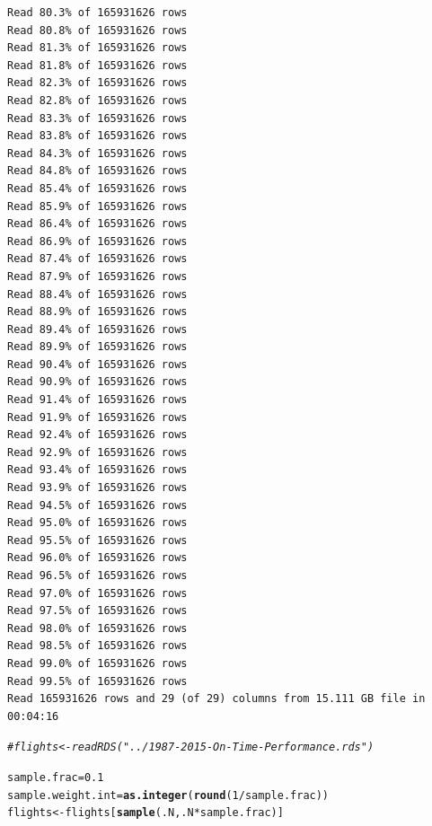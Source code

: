 \documentclass{scrreprt}\usepackage[]{graphicx}\usepackage[]{color}
\makeatletter
\newcommand{\hlnum}[1]{\textcolor[rgb]{0.686,0.059,0.569}{#1}}%
\newcommand{\hlcom}[1]{\textcolor[rgb]{0.678,0.584,0.686}{\textit{#1}}}%
\newcommand{\hlopt}[1]{\textcolor[rgb]{0,0,0}{#1}}%
\newcommand{\hlstd}[1]{\textcolor[rgb]{0.345,0.345,0.345}{#1}}%
\newcommand{\hlkwb}[1]{\textcolor[rgb]{0.69,0.353,0.396}{#1}}%
\newcommand{\hlkwd}[1]{\textcolor[rgb]{0.737,0.353,0.396}{\textbf{#1}}}%
\newenvironment{kframe}{%
 \def\at@end@of@kframe{}%
 \ifinner\ifhmode%
  \def\at@end@of@kframe{\end{minipage}}%
  \begin{minipage}{\columnwidth}%
 \fi\fi%
 \def\FrameCommand##1{\hskip\@totalleftmargin \hskip-\fboxsep
 \colorbox{shadecolor}{##1}\hskip-\fboxsep
     \hskip-\linewidth \hskip-\@totalleftmargin \hskip\columnwidth}%
 \MakeFramed {\advance\hsize-\width
   \@totalleftmargin\z@ \linewidth\hsize
   \@setminipage}}%
 {\par\unskip\endMakeFramed%
 \at@end@of@kframe}
\newenvironment{knitrout}{}{} %
\makeatother
\begin{document}
\begin{knitrout}
\begin{kframe}
\begin{verbatim}
Read 80.3% of 165931626 rows
Read 80.8% of 165931626 rows
Read 81.3% of 165931626 rows
Read 81.8% of 165931626 rows
Read 82.3% of 165931626 rows
Read 82.8% of 165931626 rows
Read 83.3% of 165931626 rows
Read 83.8% of 165931626 rows
Read 84.3% of 165931626 rows
Read 84.8% of 165931626 rows
Read 85.4% of 165931626 rows
Read 85.9% of 165931626 rows
Read 86.4% of 165931626 rows
Read 86.9% of 165931626 rows
Read 87.4% of 165931626 rows
Read 87.9% of 165931626 rows
Read 88.4% of 165931626 rows
Read 88.9% of 165931626 rows
Read 89.4% of 165931626 rows
Read 89.9% of 165931626 rows
Read 90.4% of 165931626 rows
Read 90.9% of 165931626 rows
Read 91.4% of 165931626 rows
Read 91.9% of 165931626 rows
Read 92.4% of 165931626 rows
Read 92.9% of 165931626 rows
Read 93.4% of 165931626 rows
Read 93.9% of 165931626 rows
Read 94.5% of 165931626 rows
Read 95.0% of 165931626 rows
Read 95.5% of 165931626 rows
Read 96.0% of 165931626 rows
Read 96.5% of 165931626 rows
Read 97.0% of 165931626 rows
Read 97.5% of 165931626 rows
Read 98.0% of 165931626 rows
Read 98.5% of 165931626 rows
Read 99.0% of 165931626 rows
Read 99.5% of 165931626 rows
Read 165931626 rows and 29 (of 29) columns from 15.111 GB file in 00:04:16
\end{verbatim}
\begin{alltt}
\hlcom{# flights <- readRDS("../1987-2015-On-Time-Performance.rds")}
\end{alltt}
\end{kframe}
\end{knitrout}

\begin{knitrout}
\color{fgcolor}\begin{kframe}
\begin{alltt}
\hlstd{sample.frac} \hlkwb{=} \hlnum{0.1}
\hlstd{sample.weight.int} \hlkwb{=} \hlkwd{as.integer}\hlstd{(}\hlkwd{round}\hlstd{(}\hlnum{1}\hlopt{/}\hlstd{sample.frac))}
\hlstd{flights} \hlkwb{<-} \hlstd{flights[}\hlkwd{sample}\hlstd{(.N, .N} \hlopt{*} \hlstd{sample.frac)]}
\end{alltt}
\end{kframe}
\end{knitrout}
\end{document}
